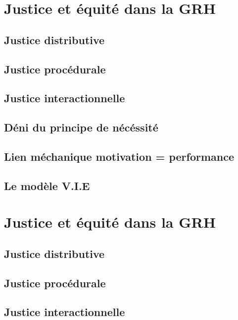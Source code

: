 \documentclass[11pt]{article} %
\begin{document}
\section{Justice et équité dans la GRH}
	\subsection{Justice distributive}
	\subsection{Justice procédurale}
	\subsection{Justice interactionnelle}
	\subsection{Déni du principe de nécéssité}
	\subsection{Lien méchanique motivation = performance}
	\subsection{Le modèle V.I.E}
\section{Justice et équité dans la GRH}
	\subsection{Justice distributive}
	\subsection{Justice procédurale}
	\subsection{Justice interactionnelle}
\end{document}
